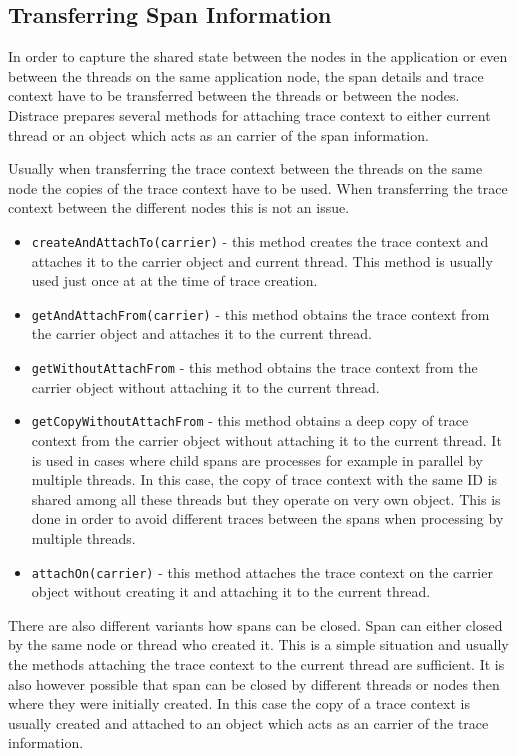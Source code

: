 \subsection{Transferring Span Information}
In order to capture the shared state between the nodes in the application or even between the threads on the same application node, the span details and trace context have to be transferred between the threads or between the nodes. Distrace prepares several methods for attaching trace context to either current thread or an object which acts as an carrier of the span information.

Usually when transferring the trace context between the threads on the same node the copies of the trace context have to be used. When transferring the trace context between the different nodes this is not an issue.
\begin{itemize}
	\item \texttt{createAndAttachTo(carrier)} - this method creates the trace context and attaches it to the carrier object and current thread. This method is usually used just once at at the time of trace creation.
	\item \texttt{getAndAttachFrom(carrier)} - this method obtains the trace context from the carrier object and attaches it to the current thread. 
	\item \texttt{getWithoutAttachFrom} - this method obtains the trace context from the carrier object without attaching it to the current thread.
	\item \texttt{getCopyWithoutAttachFrom} - this method obtains a deep copy of trace context from the carrier object without attaching it to the current thread. It is used in cases where child spans are processes for example in parallel by multiple threads. In this case, the copy of trace context with the same ID is shared among all these threads but they operate on very own object. This is done in order to avoid different traces between the spans when processing by multiple threads.
	\item \texttt{attachOn(carrier)} - this method attaches the trace context on the carrier object without creating it and attaching it to the current thread.
\end{itemize}
There are also different variants how spans can be closed. Span can either closed by the same node or thread who created it. This is a simple situation and usually the methods attaching the trace context to the current thread are sufficient. It is also however possible that span can be closed by different threads or nodes then where they were initially created. In this case the copy of a trace context is usually created and attached to an object which acts as an carrier of the trace information.
